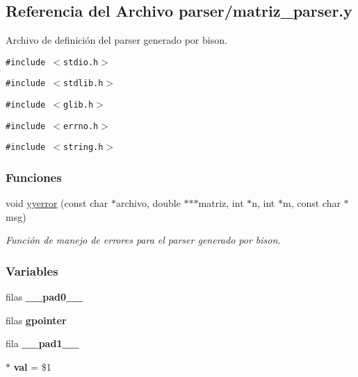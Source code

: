 \hypertarget{matriz__parser_8y}{
\subsection{Referencia del Archivo parser/matriz\_\-parser.y}
\label{matriz__parser_8y}
}
Archivo de definición del parser generado por bison. 

{\tt \#include $<$stdio.h$>$}\par
{\tt \#include $<$stdlib.h$>$}\par
{\tt \#include $<$glib.h$>$}\par
{\tt \#include $<$errno.h$>$}\par
{\tt \#include $<$string.h$>$}\par
\subsubsection*{Funciones}
\begin{CompactItemize}
\item 
void \hyperlink{matriz__parser_8y_6bbce3a09233d68cbfb268cd87cdc360}{yyerror} (const char $\ast$archivo, double $\ast$$\ast$$\ast$matriz, int $\ast$n, int $\ast$m, const char $\ast$msg)
\begin{CompactList}\small\item\em Función de manejo de errores para el parser generado por bison. \item\end{CompactList}\end{CompactItemize}
\subsubsection*{Variables}
\begin{CompactItemize}
\item 
\hypertarget{matriz__parser_8y_e6408562f83e41989823b776a086dad3}{
filas \textbf{\_\-\_\-pad0\_\-\_\-}}
\label{matriz__parser_8y_e6408562f83e41989823b776a086dad3}

\item 
\hypertarget{matriz__parser_8y_7d6cc9f3ec2940d52e822f9170c9df76}{
filas \textbf{gpointer}}
\label{matriz__parser_8y_7d6cc9f3ec2940d52e822f9170c9df76}

\item 
\hypertarget{matriz__parser_8y_c836204b2b0ad1198698f03c142496be}{
fila \textbf{\_\-\_\-pad1\_\-\_\-}}
\label{matriz__parser_8y_c836204b2b0ad1198698f03c142496be}

\item 
\hypertarget{matriz__parser_8y_005e10587e47d07d71f95ba4bc64e6fe}{
$\ast$ \textbf{val} = \$1}
\label{matriz__parser_8y_005e10587e47d07d71f95ba4bc64e6fe}

\end{CompactItemize}


